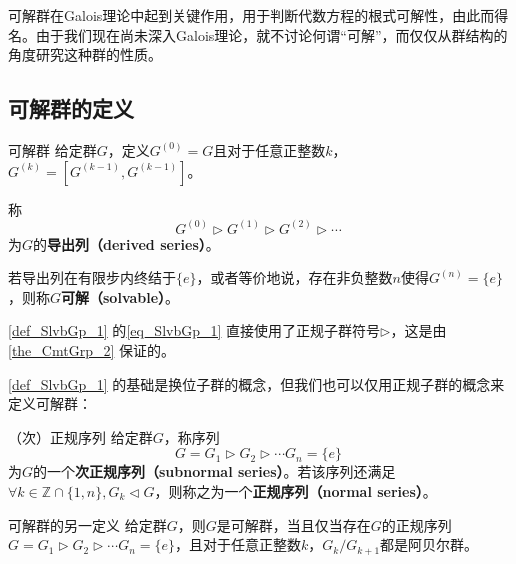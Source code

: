 



可解群在Galois理论中起到关键作用，用于判断代数方程的根式可解性，由此而得名。由于我们现在尚未深入Galois理论，就不讨论何谓“可解”，而仅仅从群结构的角度研究这种群的性质。


\subsection{可解群的定义}


\begin{definition}{可解群}\label{def_SlvbGp_1}
给定群$G$，定义$G^{(0)}=G$且对于任意正整数$k$，$G^{(k)}=[G^{(k-1)}, G^{(k-1)}]$。

称
\begin{equation}\label{eq_SlvbGp_1}
G^{(0)}\rhd G^{(1)}\rhd G^{(2)}\rhd \cdots~
\end{equation}
为$G$的\textbf{导出列（derived series）}。

若导出列在有限步内终结于$\{e\}$，或者等价地说，存在非负整数$n$使得$G^{(n)}=\{e\}$，则称$G$\textbf{可解（solvable）}。

\end{definition}


\autoref{def_SlvbGp_1} 的\autoref{eq_SlvbGp_1} 直接使用了正规子群符号$\rhd$，这是由\autoref{the_CmtGrp_2} 保证的。



\autoref{def_SlvbGp_1} 的基础是换位子群的概念，但我们也可以仅用正规子群的概念来定义可解群：



\begin{definition}{（次）正规序列}
给定群$G$，称序列
\begin{equation}
G=G_1\rhd G_2\rhd\cdots G_n=\{e\}~
\end{equation}
为$G$的一个\textbf{次正规序列（subnormal series）}。若该序列还满足$\forall k\in \mathbb{Z}\cap\{1, n\}, G_k\lhd G$，则称之为一个\textbf{正规序列（normal series）}。
\end{definition}



\begin{theorem}{可解群的另一定义}\label{the_SlvbGp_1}
给定群$G$，则$G$是可解群，当且仅当存在$G$的正规序列$G=G_1\rhd G_2\rhd\cdots G_n=\{e\}$，且对于任意正整数$k$，$G_k/G_{k+1}$都是阿贝尔群。
\end{theorem}


